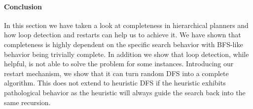 \paragraph{Conclusion}
In this section we have taken a look at completeness in hierarchical planners and how loop detection and restarts can help us to achieve it. We have shown that completeness is highly dependent on the specific search behavior with BFS-like behavior being trivially complete. In addition we show that loop detection, while helpful, is not able to solve the problem for some instances. Introducing our restart mechanism, we show that it can turn random DFS into a complete algorithm. This does not extend to heuristic DFS if the heuristic exhibits pathological behavior as the heuristic will always guide the search back into the same recursion.


